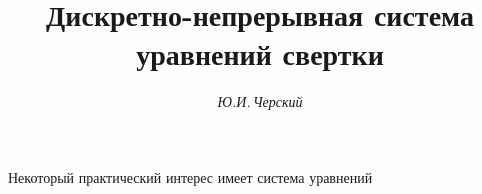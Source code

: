 

 




 


\newcommand{\tts}[1]{} 


 




  


\setcounter{page}{81} 












\author{\it Ю.И.\,Черский} 




\title{Дискретно-непрерывная система уравнений свертки} 


 


\date{} 




\pagestyle{plain} %


 




\maketitle 


\label{begin} 


 


Некоторый практический интерес имеет система уравнений 


